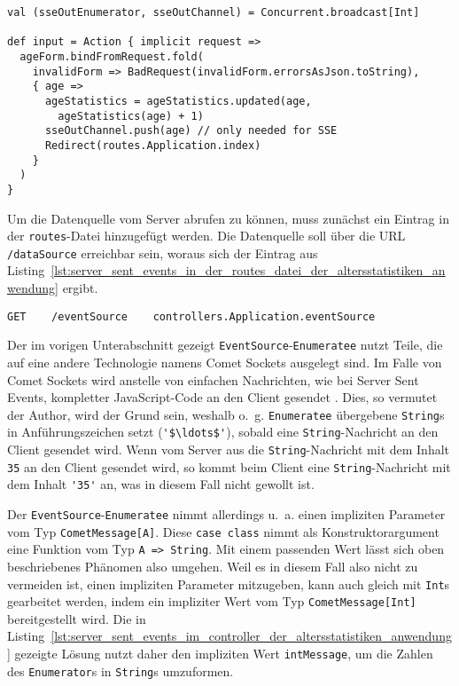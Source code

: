 \begin{lstlisting}[caption=Server Sent Events in der input-Action der Altersstatistiken-Anwendung, label=lst:server_sent_events_in_der_input_action_der_altersstatistiken_anwendung]
val (sseOutEnumerator, sseOutChannel) = Concurrent.broadcast[Int]

def input = Action { implicit request =>
  ageForm.bindFromRequest.fold(
    invalidForm => BadRequest(invalidForm.errorsAsJson.toString),
    { age =>
      ageStatistics = ageStatistics.updated(age,
        ageStatistics(age) + 1)
      sseOutChannel.push(age) // only needed for SSE
      Redirect(routes.Application.index)
    }
  )
}
\end{lstlisting}

Um die Datenquelle vom Server abrufen zu können, muss zunächst ein Eintrag in der \lstinline|routes|-Datei hinzugefügt werden.
Die Datenquelle soll über die URL \lstinline|/dataSource| erreichbar sein, woraus sich der Eintrag aus Listing~\ref{lst:server_sent_events_in_der_routes_datei_der_altersstatistiken_anwendung} ergibt.

\begin{lstlisting}[caption=Server Sent Events in der routes-Datei der Altersstatistiken-Anwendung, label=lst:server_sent_events_in_der_routes_datei_der_altersstatistiken_anwendung]
GET    /eventSource    controllers.Application.eventSource
\end{lstlisting}

Der im vorigen Unterabschnitt gezeigt \lstinline|EventSource|-\lstinline|Enumeratee| nutzt Teile, die auf eine andere Technologie namens Comet Sockets ausgelegt sind.
Im Falle von Comet Sockets wird anstelle von einfachen Nachrichten, wie bei Server Sent Events, kompletter JavaScript-Code an den Client gesendet \cite[vgl.][]{play_comet_sockets}.
Dies, so vermutet der Author, wird der Grund sein, weshalb o.~g. \lstinline|Enumeratee| übergebene \lstinline|String|s in Anführungszeichen setzt (\lstinline[mathescape]|'$\ldots$'|), sobald eine \lstinline|String|-Nachricht an den Client gesendet wird.
Wenn vom Server aus die \lstinline|String|-Nachricht mit dem Inhalt \lstinline|35| an den Client gesendet wird, so kommt beim Client eine \lstinline|String|-Nachricht mit dem Inhalt \lstinline|'35'| an, was in diesem Fall nicht gewollt ist.

Der \lstinline|EventSource|-\lstinline|Enumeratee| nimmt allerdings u.~a. einen impliziten Parameter vom Typ \lstinline|CometMessage[A]|.
Diese \lstinline|case class| nimmt als Konstruktorargument eine Funktion vom Typ \lstinline|A => String|.
Mit einem passenden Wert lässt sich oben beschriebenes Phänomen also umgehen.
Weil es in diesem Fall also nicht zu vermeiden ist, einen impliziten Parameter mitzugeben, kann auch gleich mit \lstinline|Int|s gearbeitet werden, indem ein impliziter Wert vom Typ \lstinline|CometMessage[Int]| bereitgestellt wird.
Die in Listing~\ref{lst:server_sent_events_im_controller_der_altersstatistiken_anwendung} gezeigte Lösung nutzt daher den impliziten Wert \lstinline|intMessage|, um die Zahlen des \lstinline|Enumerator|s in \lstinline|String|s umzuformen.

